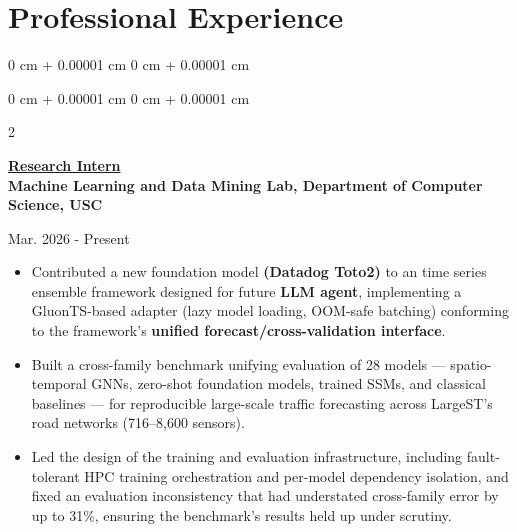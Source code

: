 \documentclass[10pt, letterpaper]{article}
\newenvironment{onecolentry}{
    \begin{adjustwidth}{
        0 cm + 0.00001 cm
    }{
        0 cm + 0.00001 cm
    }
}{
    \end{adjustwidth}
} %
\newenvironment{twocolentry}[2][]{
    \onecolentry
    \def\secondColumn{#2}
    \setcolumnwidth{\fill, 4.5 cm}
    \begin{paracol}{2}
}{
    \switchcolumn \raggedleft \secondColumn
    \end{paracol}
    \endonecolentry
} %
\begin{document}
    \section{Professional Experience}

    \begin{onecolentry}
        \begin{twocolentry}{
            Mar. 2026 - Present
        }
        \textbf{\underline{Research Intern}} \\
        \textbf{Machine Learning and Data Mining Lab, Department of Computer Science, USC}
        \end{twocolentry}

        \begin{itemize}

            \item Contributed a new foundation model \textbf{(Datadog Toto2)} to an time series ensemble framework designed for future \textbf{LLM agent}, implementing a GluonTS-based adapter (lazy model loading, OOM-safe batching) conforming to the framework's \textbf{unified forecast/cross-validation interface}.

            \item Built a cross-family benchmark unifying evaluation of 28 models — spatio-temporal GNNs, zero-shot foundation models, trained SSMs, and classical baselines — for reproducible large-scale traffic forecasting across LargeST's road networks (716–8,600 sensors).

            \item Led the design of the training and evaluation infrastructure, including fault-tolerant HPC training orchestration and per-model dependency isolation, and fixed an evaluation inconsistency that had understated cross-family error by up to 31\%, ensuring the benchmark's results held up under scrutiny.

        \end{itemize}
        
    \end{onecolentry}
\end{document}

